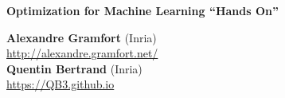 \documentclass[unknownkeysallowed]{beamer}
\begin{document}
\begin{frame}

   \bigskip
   \bigskip

   \begin{center}{\color{marron}
       \huge
      \textbf{Optimization for Machine Learning ``Hands On''}
   }\end{center}
   \bigskip
   \begin{center}
   \textbf{Alexandre Gramfort} (Inria) \\
   \url{http://alexandre.gramfort.net/} \\
   
   
  \bigskip
   \textbf{Quentin Bertrand} (Inria) \\
   \url{https://QB3.github.io} \\

   \end{center}
\end{frame}


\tableofcontents











\begin{frame}[allowframebreaks]
   \printbibliography
\end{frame}
\end{document}
